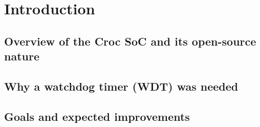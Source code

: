
\chapter{Introduction}
\label{chap:introduction}

\section{Overview of the Croc SoC and its open-source nature}

\section{Why a watchdog timer (WDT) was needed}

\section{Goals and expected improvements}

